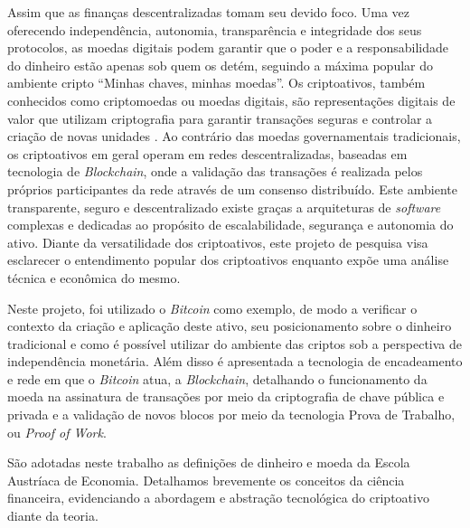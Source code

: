 \documentclass[article,12pt,oneside,a4paper,english,brazil]{unifil}
\begin{document}
\begin{Spacing}{1.5}
Assim que as finanças descentralizadas tomam seu devido foco. Uma vez oferecendo independência, autonomia, transparência e integridade dos seus protocolos, as moedas digitais podem garantir que o poder e a responsabilidade do dinheiro estão apenas sob quem os detém, seguindo a máxima popular do ambiente cripto ``Minhas chaves, minhas moedas''.
Os criptoativos, também conhecidos como criptomoedas ou moedas digitais, são representações digitais de valor que utilizam criptografia para garantir transações seguras e controlar a criação de novas unidades \cite{Yetmar2023}. Ao contrário das moedas governamentais tradicionais, os criptoativos em geral operam em redes descentralizadas, baseadas em tecnologia de \textit{Blockchain}, onde a validação das transações é realizada pelos próprios participantes da rede através de um consenso distribuído. Este ambiente transparente, seguro e descentralizado existe graças a arquiteturas de \textit{software} complexas e dedicadas ao propósito de escalabilidade, segurança e autonomia do ativo. Diante da versatilidade dos criptoativos, este projeto de pesquisa visa esclarecer o entendimento popular dos criptoativos enquanto expõe uma análise técnica e econômica do mesmo.

Neste projeto, foi utilizado o \textit{Bitcoin} como exemplo, de modo a verificar o contexto da criação e aplicação deste ativo, seu posicionamento sobre o dinheiro tradicional e como é possível utilizar do ambiente das criptos sob a perspectiva de independência monetária. Além disso é apresentada a tecnologia de encadeamento e rede em que o \textit{Bitcoin} atua, a \textit{Blockchain}, detalhando o funcionamento da moeda na assinatura de transações por meio da criptografia de chave pública e privada e a validação de novos blocos por meio da tecnologia Prova de Trabalho, ou \textit{Proof of Work}.

São adotadas neste trabalho as definições de dinheiro e moeda da Escola Austríaca de Economia. Detalhamos brevemente os conceitos da ciência financeira, evidenciando a abordagem e abstração tecnológica do criptoativo diante da teoria.






\end{Spacing}
\end{document}
